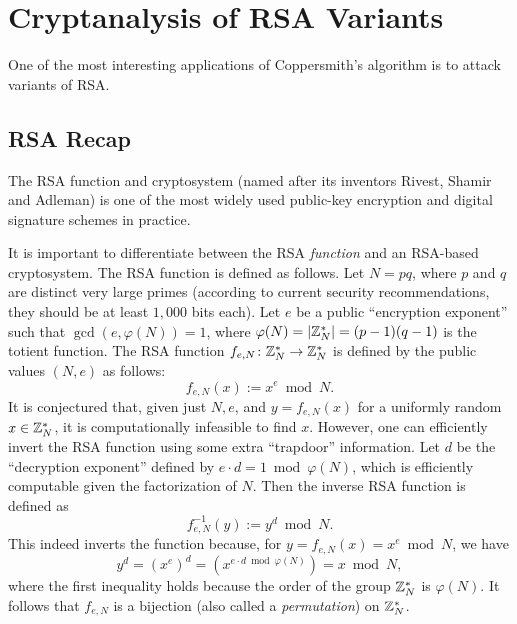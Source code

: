 \documentclass[11pt]{article}
\begin{document}



\section{Cryptanalysis of RSA Variants}
\label{sec:crypt-rsa}

One of the most interesting applications of Coppersmith's algorithm is
to attack variants of RSA.

\subsection{RSA Recap}
\label{sec:rsa-recap}

The RSA function and cryptosystem (named after its inventors Rivest,
Shamir and Adleman) is one of the most widely used public-key
encryption and digital signature schemes in practice.

It is important to differentiate between the RSA \emph{function} and
an RSA-based cryptosystem. The RSA function is defined as follows. Let
$N=pq$, where $p$ and $q$ are distinct very large primes (according to
current security recommendations, they should be at least $1{,}000$
bits each). Let $e$ be a public ``encryption exponent'' such that
$\gcd(e,\varphi(N))=1$, where $\varphi(N) = \lvert\mathbb{Z}_{N}^{*}\rvert =
(p-1)(q-1)$ is the totient function. The RSA function $f_{e,N} \colon
\mathbb{Z}_{N}^{*} \to \mathbb{Z}_{N}^{*}$ is defined by the public values $(N,e)$ as
follows:
\begin{equation}
  \label{eq:rsa}
  f_{e,N}(x) := x^{e} \bmod N.
\end{equation}
It is conjectured that, given just $N,e$, and $y=f_{e,N}(x)$ for a
uniformly random $x \in \mathbb{Z}_{N}^{*}$, it is computationally infeasible
to find $x$.  However, one can efficiently invert the RSA function
using some extra ``trapdoor'' information. Let $d$ be the 
``decryption exponent'' defined by $e \cdot d=1 \bmod \varphi(N)$,
which is efficiently computable given the factorization of $N$.  Then
the inverse RSA function is defined as
\begin{equation}
  \label{eq:rsa-inv}
  f_{e,N}^{-1}(y) := y^{d} \bmod N.
\end{equation}
This indeed inverts the function because, for $y=f_{e,N}(x) = x^{e}
\bmod N$, we have
\[ y^d=(x^e)^d = (x^{e \cdot d \bmod \varphi(N)}) = x \bmod N, \]
where the first inequality holds because the order of the group
$\mathbb{Z}_{N}^{*}$ is $\varphi(N)$.  It follows that $f_{e,N}$ is a
bijection (also called a \emph{permutation}) on $\mathbb{Z}_{N}^{*}$.
\end{document}
